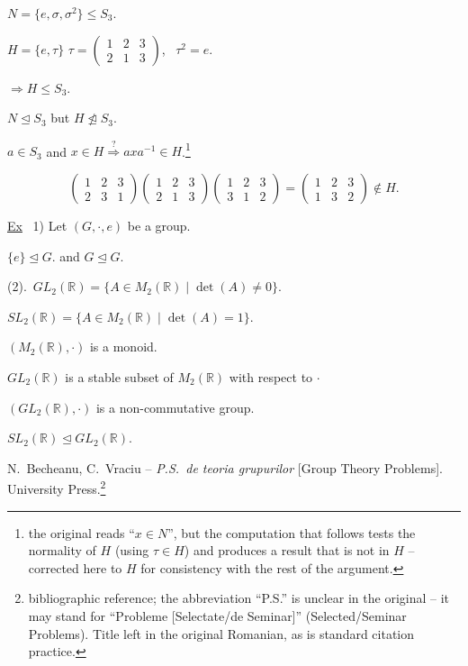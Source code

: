 \documentclass[12pt]{article}
\begin{document}
\noindent $N=\{e,\sigma,\sigma^2\} \leq S_3$.

\bigskip
\noindent $H=\{e,\tau\}$ \quad $\tau = \begin{pmatrix}1&2&3\\2&1&3\end{pmatrix}$, \ $\tau^2=e$.

\noindent $\Rightarrow H\leq S_3$.

\bigskip
\noindent $N \trianglelefteq S_3$ \quad but \quad $H\not\trianglelefteq S_3$.

\bigskip
\noindent $a\in S_3$ and $x\in H \overset{?}{\Rightarrow} axa^{-1}\in H$.\footnote{the original reads ``$x\in N$'', but the computation that follows tests the normality of $H$ (using $\tau\in H$) and produces a result that is not in $H$ -- corrected here to $H$ for consistency with the rest of the argument.}

\[
\begin{pmatrix}1&2&3\\2&3&1\end{pmatrix}\begin{pmatrix}1&2&3\\2&1&3\end{pmatrix}\begin{pmatrix}1&2&3\\3&1&2\end{pmatrix} = \begin{pmatrix}1&2&3\\1&3&2\end{pmatrix} \notin H.
\]

\bigskip
\noindent\underline{Ex} \ 1) Let $(G,\cdot,e)$ be a group.

\noindent $\{e\}\trianglelefteq G$. \quad and \quad $G\trianglelefteq G$.

\bigskip
\noindent (2).\ $GL_2(\mathbb{R}) = \{A\in M_2(\mathbb{R}) \mid \det(A)\neq 0\}$.

\noindent $SL_2(\mathbb{R}) = \{A\in M_2(\mathbb{R}) \mid \det(A)=1\}$.

\noindent $(M_2(\mathbb{R}),\cdot)$ is a monoid.

\noindent $GL_2(\mathbb{R})$ is a stable subset of $M_2(\mathbb{R})$ with respect to $\cdot$

\noindent $(GL_2(\mathbb{R}),\cdot)$ is a non-commutative group.

\noindent $SL_2(\mathbb{R}) \trianglelefteq GL_2(\mathbb{R})$.

\bigskip
\noindent N.\ Becheanu, C.\ Vraciu -- \emph{P.S.\ de teoria grupurilor} [Group Theory Problems]. University Press.\footnote{bibliographic reference; the abbreviation ``P.S.'' is unclear in the original -- it may stand for ``Probleme [Selectate/de Seminar]'' (Selected/Seminar Problems). Title left in the original Romanian, as is standard citation practice.}
\end{document}
